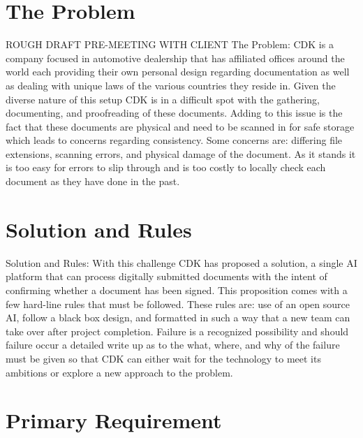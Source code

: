 \documentclass[onecolumn, draftclsnofoot,10pt, compsoc]{IEEEtran}
\begin{document}
\newpage
{}
\tableofcontents
\clearpage

\section{The Problem}
	ROUGH DRAFT PRE-MEETING WITH CLIENT
The Problem:
CDK is a company focused in automotive dealership that has affiliated offices around the world each providing their own personal design regarding documentation as well as dealing with unique laws of the various countries they reside in. Given the diverse nature of this setup CDK is in a difficult spot with the gathering, documenting, and proofreading of these documents. Adding to this issue is the fact that these documents are physical and need to be scanned in for safe storage which leads to concerns regarding consistency. Some concerns are: differing file extensions, scanning errors, and physical damage of the document. As it stands it is too easy for errors to slip through and is too costly to locally check each document as they have done in the past. 

\section{Solution and Rules}
Solution and Rules:
With this challenge CDK has proposed a solution, a single AI platform that can process digitally submitted documents with the intent of confirming whether a document has been signed. This proposition comes with a few hard-line rules that must be followed. These rules are: use of an open source AI, follow a black box design, and formatted in such a way that a new team can take over after project completion. Failure is a recognized possibility and should failure occur a detailed write up as to the what, where, and why of the failure must be given so that CDK can either wait for the technology to meet its ambitions or explore a new approach to the problem.

\section{Primary Requirement}
\end{document}
